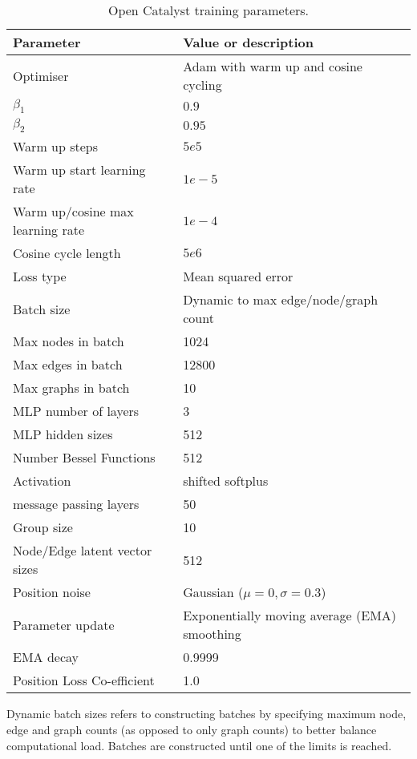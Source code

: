 \documentclass{article} \usepackage{iclr2022_conference,times}
\begin{document}
\begin{table}[]
\caption{Open Catalyst training parameters.}
    \label{oc_params}
    \centering
    \begin{tabular}{ll}
      \toprule
       Parameter & Value or description \\
       \midrule
       Optimiser & Adam with warm up and cosine cycling \\
       $\beta_1$   & $0.9$ \\              
       $\beta_2$   & $0.95$ \\                     
       Warm up steps    & $5e5$ \\
       Warm up start learning rate    & $1e-5$ \\       
       Warm up/cosine max learning rate    & $1e-4$ \\       
       Cosine cycle length    & $5e6$ \\       
       Loss type & Mean squared error \\
     \midrule
       Batch size & Dynamic to max edge/node/graph count \\
       Max nodes in batch & 1024 \\
       Max edges in batch & 12800 \\   
       Max graphs in batch & 10 \\    
     \midrule
       MLP number of layers & 3 \\
       MLP hidden sizes & 512 \\
       Number Bessel Functions & 512 \\
       Activation & shifted softplus \\
       message passing layers & 50 \\
       Group size & 10 \\
       Node/Edge latent vector sizes & 512 \\ 
     \midrule
       Position noise & Gaussian ($\mu=0, \sigma=0.3$) \\
       Parameter update & Exponentially moving average (EMA) smoothing \\
       EMA decay & 0.9999 \\
       Position Loss Co-efficient & 1.0 \\
    \bottomrule

\end{tabular}

\end{table}

Dynamic batch sizes refers to constructing batches by specifying maximum node, edge and graph counts (as opposed to only graph counts) to better balance computational load. Batches are constructed until one of the limits is reached.
\end{document}
